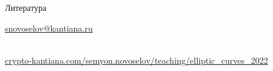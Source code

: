 \documentclass{beamer}
\begin{document}
\begin{frame}{Литература}
    \nocite{Washington2008}
    \nocite{Lang1978}
    \nocite{vanTuyl1997}
    \nocite{GathenJurgen2013}
    \nocite{CohenFrey+2005}
    \printbibliography
    
\begin{center}
    \begin{tcolorbox}[enhanced,hbox,colback=block-green-color-bg,colframe=subsection-color!120,title=Контакты,center title]
        \begin{varwidth}{\textwidth}
            \begin{center}
                \href{mailto:snovoselov@kantiana.ru}{snovoselov@kantiana.ru}
            \end{center}
        \end{varwidth}
    \end{tcolorbox}	
\end{center}

\\
{\footnotesize
    \href{https://crypto-kantiana.com/semyon.novoselov/teaching/elliptic_curves_2021}{crypto-kantiana.com/semyon.novoselov/teaching/elliptic\_curves\_2022}
}
\end{frame}
\end{document}
